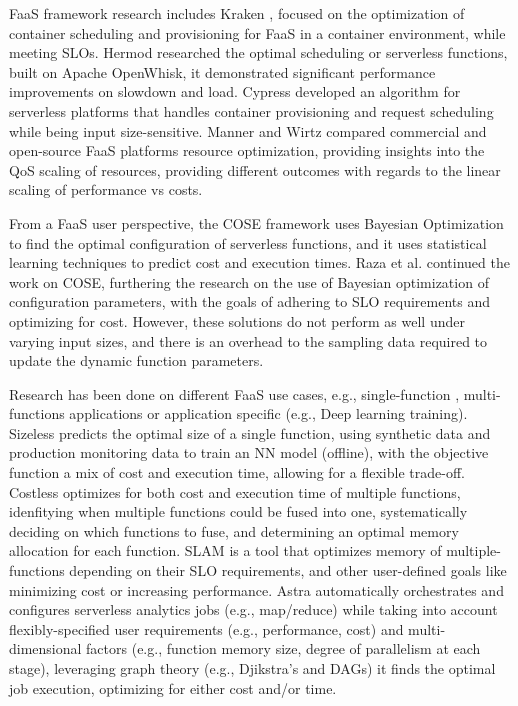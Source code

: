 \documentclass[conference]{IEEEtran}
\begin{document}
FaaS framework research includes Kraken \cite{10.1145/3472883.3486992}, focused on the optimization of container scheduling and provisioning for FaaS in a container environment, while meeting SLOs. Hermod \cite{10.1145/3542929.3563468} researched the optimal scheduling or serverless functions, built on Apache OpenWhisk, it demonstrated significant performance improvements on slowdown and load. Cypress \cite{10.1145/3542929.3563464} developed an algorithm for serverless platforms that handles container provisioning and request scheduling while being input size-sensitive. Manner and Wirtz \cite{9860370} compared commercial and open-source FaaS platforms resource optimization, providing insights into the QoS scaling of resources, providing different outcomes with regards to the linear scaling of performance vs costs.

From a FaaS user perspective, the COSE \cite{9155363} framework uses Bayesian Optimization to find the optimal configuration of serverless functions, and it uses statistical learning techniques to predict cost and execution times. Raza et al. \cite{10063937} continued the work on COSE, furthering the research on the use of Bayesian optimization of configuration parameters, with the goals of adhering to SLO requirements and optimizing for cost. However, these solutions do not perform as well under varying input sizes, and there is an overhead to the sampling data required to update the dynamic function parameters. 

Research has been done on different FaaS use cases, e.g., single-function \cite{10.1145/3429880.3430099, 9946331, 9881584}, multi-functions applications \cite{s23187829, 8567674} or application specific \cite{9826021} (e.g., Deep learning training). Sizeless \cite{10.1145/3464298.3493398} predicts the optimal size of a single function, using synthetic data and production monitoring data to train an NN model (offline), with the objective function a mix of cost and execution time, allowing for a flexible trade-off. Costless \cite {8567674} optimizes for both cost and execution time of multiple functions, idenfitying when multiple functions could be fused into one, systematically deciding on which functions to fuse, and determining an optimal memory allocation for each function. SLAM \cite{9860980} is a tool that optimizes memory of multiple-functions depending on their SLO requirements, and other user-defined goals like minimizing cost or increasing performance. Astra \cite{9460548} automatically orchestrates and configures serverless analytics jobs (e.g., map/reduce) while taking into account flexibly-specified user requirements (e.g., performance, cost) and multi-dimensional factors (e.g., function memory size, degree of parallelism at each stage), leveraging graph theory (e.g., Djikstra's and DAGs) it finds the optimal job execution, optimizing for either cost and/or time.
\end{document}
